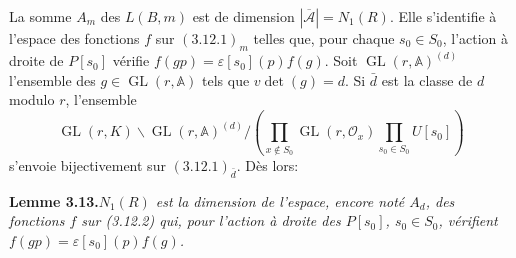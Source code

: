 \documentclass[11pt]{article}
\newcommand{\GL}{\operatorname{GL}}
\newcommand{\Acal}{\mathcal{A}}
\newcommand{\Adele}{\mathbb{A}}
\begin{document}
La somme \(A_m\) des \(L(B,m)\) est de dimension \(|\overline{\Acal}|=N_1(R)\). Elle s'identifie à l'espace des fonctions \(f\) sur \((3.12.1)_m\) telles que, pour chaque \(s_0\in S_0\), l'action à droite de \(P[s_0]\) vérifie \(f(gp)=\varepsilon[s_0](p)f(g)\). Soit \(\GL(r,\Adele)^{(d)}\) l'ensemble des \(g\in\GL(r,\Adele)\) tels que \(v\det(g)=d\). Si \(\bar d\) est la classe de \(d\) modulo \(r\), l'ensemble
\begin{equation}
\GL(r,K)\backslash\GL(r,\Adele)^{(d)}\Big/\left(\prod_{x\notin S_0}\GL(r,\mathcal O_x)\prod_{s_0\in S_0}U[s_0]\right)
\tag{3.12.2}
\end{equation}
s'envoie bijectivement sur \((3.12.1)_{\bar d}\). Dès lors:

\noindent\textbf{Lemme 3.13.}\quad\textit{\(N_1(R)\) est la dimension de l'espace, encore noté \(A_d\), des fonctions \(f\) sur (3.12.2) qui, pour l'action à droite des \(P[s_0]\), \(s_0\in S_0\), vérifient \(f(gp)=\varepsilon[s_0](p)f(g)\).}
\end{document}
